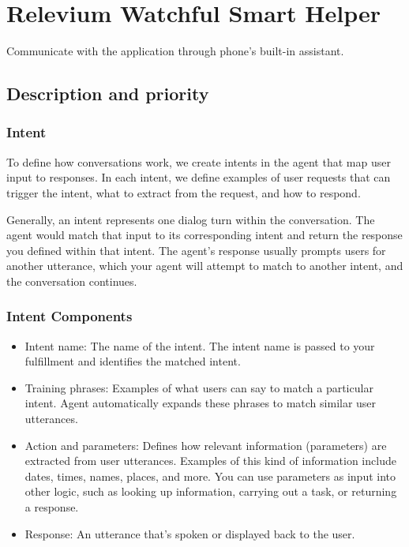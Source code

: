 \documentclass{scrreprt}
\begin{document}
\section{Relevium Watchful Smart Helper}
Communicate with the application through phone's built-in assistant.


\subsection{Description and priority}

\subsubsection{Intent}

To define how conversations work, we create intents in the agent that map user input to responses. In each intent, we define examples of user requests that can trigger the intent, what to extract from the request, and how to respond.

Generally, an intent represents one dialog turn within the conversation. The agent would match that input to its corresponding intent and return the response you defined within that intent. The agent's response usually prompts users for another utterance, which your agent will attempt to match to another intent, and the conversation continues.



\subsubsection{Intent Components}

\begin{itemize}
    \item Intent name: The name of the intent. The intent name is passed to your fulfillment and identifies the matched intent.

    \item Training phrases: Examples of what users can say to match a particular intent. Agent automatically expands these phrases to match similar user utterances.

    \item Action and parameters: Defines how relevant information (parameters) are extracted from user utterances. Examples of this kind of information include dates, times, names, places, and more. You can use parameters as input into other logic, such as looking up information, carrying out a task, or returning a response.

    \item Response: An utterance that's spoken or displayed back to the user.
\end{itemize}
\end{document}
